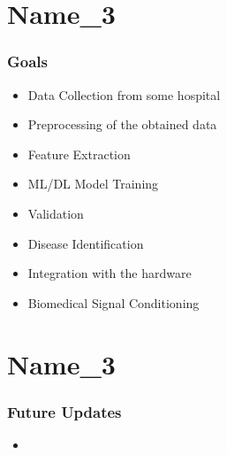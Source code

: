 \documentclass{beamer}
\begin{document}

\section{Name\_3}
\begin{frame}[allowframebreak]
\frametitle{Goals}\small

\begin{itemize}
    \item {Data Collection from some hospital}
    \item {Preprocessing of the obtained data}
    \item{Feature Extraction}
    \item{ML/DL Model Training}
    \item{Validation}
    \item{Disease Identification}
    \item{Integration with the hardware}
    \item{Biomedical Signal Conditioning}
\end{itemize}
\end{frame}

\section{Name\_3}
\begin{frame}[allowframebreak]
\frametitle{Future Updates}\small

\begin{itemize}
    \item 
\end{itemize}
\end{frame}

\end{document}
